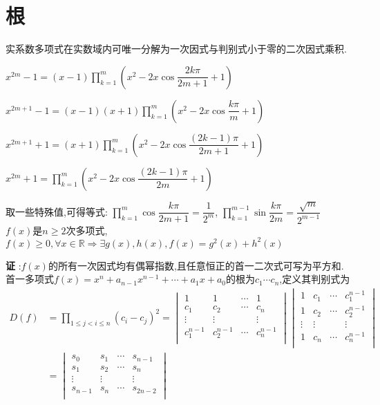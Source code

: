 \section{根}
实系数多项式在实数域内可唯一分解为一次因式与判别式小于零的二次因式乘积.

$ x^{2m}-1=(x-1) \prod_{k=1}^m{( x^2-2x\cos\dfrac{2k\pi}{2m+1}+1 )}$

$ x^{2m+1}-1 =(x-1)(x+1)\prod_{k=1}^m{(x^2-2x\cos\dfrac{k\pi}{m}+1)}$ 

$ x^{2m+1}+1=(x+1)\prod_{k=1}^m{( x^2-2x\cos\dfrac{(2k-1)\pi}{2m+1}+1 )}$

$ x^{2m}+1=\prod_{k=1}^m{(x^2-2x\cos\dfrac{(2k-1)\pi}{2m}+1)}$

取一些特殊值,可得等式:
$ \prod_{k=1}^m{\cos\dfrac{k\pi}{2m+1}}=\dfrac{1}{2^m}$,
$ \prod_{k=1}^{m-1}{\sin\dfrac{k\pi}{2m}}=\dfrac{\sqrt{m}}{2^{m-1}}$
\\

$ f(x)$是$ n\ge2$次多项式,$ f(x)\ge 0,\forall x\in \mathbb{R}\Rightarrow \exists g(x),h(x),f(x)=g^2(x)+h^2(x)$

{\bf 证 }:$ f(x)$的所有一次因式均有偶幂指数,且任意恒正的首一二次式可写为平方和.
\\

首一多项式$ f(x)=x^n+a_{n-1}x^{n-1}+\cdots+a_1x+a_0$的根为$ c_1\cdots c_n$,定义其判别式为
\[ \begin{aligned}
	D(f) & =\prod_{1\le j< i\le n}{(c_i-c_j)^2}=
		\begin{vmatrix} 
		1 & 1 & \cdots & 1\\
		c_1 & c_2 & \cdots & c_n \\
		\vdots & \vdots & & \vdots \\
		c_1^{n-1} & c_2^{n-1} & \cdots & c_n^{n-1}\\
		\end{vmatrix}
		\begin{vmatrix}
		1 & c_1 & \cdots & c_1^{n-1}\\
		1 & c_2 & \cdots & c_2^{n-1}\\
		\vdots & \vdots & & \vdots \\
		1 & c_n & \cdots & c_n^{n-1}\\
		\end{vmatrix} \\
		& = \begin{vmatrix}
			s_0 & s_1 & \cdots & s_{n-1}\\
			s_1 & s_2 & \cdots & s_{n}\\
			\vdots & \vdots & & \vdots \\
			s_{n-1} & s_{n} & \cdots & s_{2n-2}\\
			\end{vmatrix}
\end{aligned} \]

